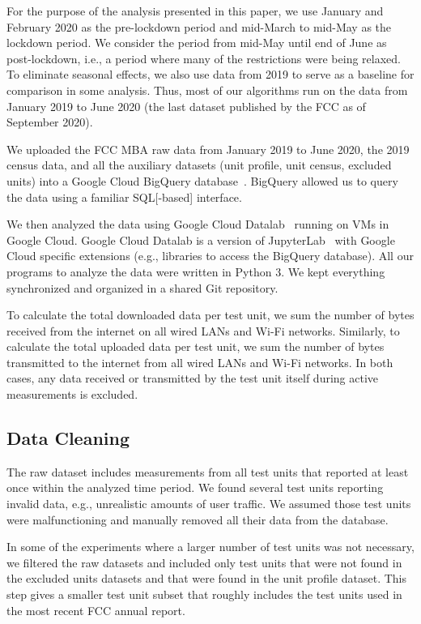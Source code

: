 \documentclass[conference,10pt]{IEEEtran}
\begin{document}
For the purpose of the analysis presented in this paper, we use January and February 2020 as the pre-lockdown period and mid-March to mid-May as the lockdown period. We consider the period from mid-May until end of June as post-lockdown, i.e., a period where many of the restrictions were being relaxed. To eliminate seasonal effects, we also use data from 2019 to serve as a baseline for comparison in some analysis. Thus, most of our algorithms run on the data from January 2019 to June 2020 (the last dataset published by the \gls{FCC} as of September 2020).

We uploaded the \gls{FCC} \gls{MBA} raw data from January 2019 to June 2020, the 2019 census data, and all the auxiliary datasets (unit profile, unit census, excluded units) into a Google Cloud BigQuery database~\cite{bigquery}. BigQuery allowed us to query the data using a familiar \gls{SQL}[-based] interface.

We then analyzed the data using Google Cloud Datalab~\cite{datalab} running on \glspl{VM} in Google Cloud. Google Cloud Datalab is a version of JupyterLab~\cite{jupyter} with Google Cloud specific extensions (e.g., libraries to access the BigQuery database). All our programs to analyze the data were written in Python 3. We kept everything synchronized and organized in a shared Git repository.

To calculate the total downloaded data per test unit, we sum the number of bytes received from the internet on all wired \glspl{LAN} and Wi-Fi networks. Similarly, to calculate the total uploaded data per test unit, we sum the number of bytes transmitted to the internet from all wired \glspl{LAN} and Wi-Fi networks. In both cases, any data received or transmitted by the test unit itself during active measurements is excluded.

\subsection{Data Cleaning}

The raw dataset includes measurements from all test units that reported at least once within the analyzed time period. We found several test units reporting invalid data, e.g., unrealistic amounts of user traffic. We assumed those test units were malfunctioning and manually removed all their data from the database.

In some of the experiments where a larger number of test units was not necessary, we filtered the raw datasets and included only test units that were not found in the excluded units datasets and that were found in the unit profile dataset. This step gives a smaller test unit subset that roughly includes the test units used in the most recent \gls{FCC} annual report.
\end{document}
